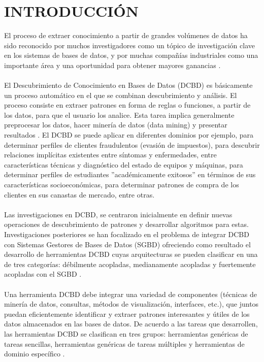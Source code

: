\pagestyle{plain}
\setcounter{page}{5}
\chapter{INTRODUCCI\'ON}
El proceso de extraer conocimiento a partir de grandes vol\'umenes de datos ha sido reconocido por muchos
investigadores como un t\'opico de investigaci\'on clave en los sistemas de bases de datos, y por muchas compa\~n\'ias industriales como una importante \'area y una oportunidad para obtener mayo\-res ganancias \cite{31}.\\
\\
El Descubrimiento de Conocimiento en Bases de Datos (DCBD) es b\'asicamente un proceso autom\'atico en el que se combinan descubrimiento y an\'alisis. El proceso consiste en extraer patrones en forma de reglas o funciones, a partir de los datos, para que el usuario los analice. Esta tarea implica generalmente preprocesar los datos, hacer miner\'ia de datos (data mining) y presentar resultados \cite{1,4,7,19,23}. El DCBD se puede aplicar en diferentes dominios por ejemplo, para determinar perfiles de clientes fraudulentos (evasi\'on de impuestos), para descubrir relaciones impl\'icitas existentes entre s\'intomas y enfermedades, entre caracter\'isticas t\'ecnicas y diagn\'ostico del estado de equipos y m\'aquinas, para determinar perfiles de estudiantes ''acad\'emicamente exitosos'' en t\'erminos de sus caracter\'isticas socioecon\'omicas, para determinar patrones de compra de los clientes en sus canastas de mercado, entre otras.\\
\\
Las investigaciones en DCBD, se centraron inicialmente en definir nuevas operaciones de descubrimiento de patrones y desarrollar algoritmos para estas. Investigaciones posteriores se han focalizado en el problema de integrar DCBD con Sistemas Gestores de  Bases de Datos (SGBD) ofreciendo como resultado el desarrollo de herramientas  DCBD cuyas arquitecturas se pueden clasificar en una de tres categor\'ias: d\'ebilmente acopladas, medianamente acopladas y fuertemente acopladas con el SGBD \cite{30}.\\
\\
Una herramienta DCBD debe integrar una variedad de componentes (t\'ecnicas de miner\'ia de datos, consultas, m\'etodos de visualizaci\'on, interfaces, etc.), que juntos puedan eficientemente identificar y extraer patrones interesantes y \'utiles de los datos almacenados en las bases de datos.  De acuerdo a las tareas que desarrollen, las herramientas DCBD se clasifican en tres grupos: herramientas gen\'ericas de tareas sencillas, herramientas gen\'ericas de tareas m\'ultiples y herramientas de dominio espec\'ifico \cite{23}.\\
